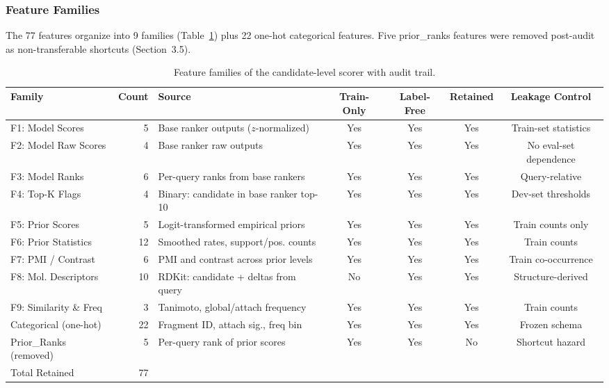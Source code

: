 \documentclass[12pt,letterpaper]{article}
\begin{document}
\subsubsection{Feature Families}

The 77 features organize into 9 families (Table~\ref{tab:M3}) plus 22 one-hot categorical features. Five prior\_ranks features were removed post-audit as non-transferable shortcuts (Section~3.5).

\begin{table}[ht]
\centering
\caption{Feature families of the candidate-level scorer with audit trail.}
\label{tab:M3}
\small
\begin{tabular}{lrlcccc}
\toprule
Family & Count & Source & Train-Only & Label-Free & Retained & Leakage Control \\
\midrule
F1: Model Scores & 5 & Base ranker outputs ($z$-normalized) & Yes & Yes & Yes & Train-set statistics \\
F2: Model Raw Scores & 4 & Base ranker raw outputs & Yes & Yes & Yes & No eval-set dependence \\
F3: Model Ranks & 6 & Per-query ranks from base rankers & Yes & Yes & Yes & Query-relative \\
F4: Top-K Flags & 4 & Binary: candidate in base ranker top-10 & Yes & Yes & Yes & Dev-set thresholds \\
F5: Prior Scores & 5 & Logit-transformed empirical priors & Yes & Yes & Yes & Train counts only \\
F6: Prior Statistics & 12 & Smoothed rates, support/pos. counts & Yes & Yes & Yes & Train counts \\
F7: PMI / Contrast & 6 & PMI and contrast across prior levels & Yes & Yes & Yes & Train co-occurrence \\
F8: Mol. Descriptors & 10 & RDKit: candidate + deltas from query & No & Yes & Yes & Structure-derived \\
F9: Similarity \& Freq & 3 & Tanimoto, global/attach frequency & Yes & Yes & Yes & Train counts \\
Categorical (one-hot) & 22 & Fragment ID, attach sig., freq bin & Yes & Yes & Yes & Frozen schema \\
Prior\_Ranks (removed) & 5 & Per-query rank of prior scores & Yes & Yes & No & Shortcut hazard \\
\midrule
Total Retained & 77 & & & & & \\
\bottomrule
\end{tabular}
\end{table}
\end{document}
